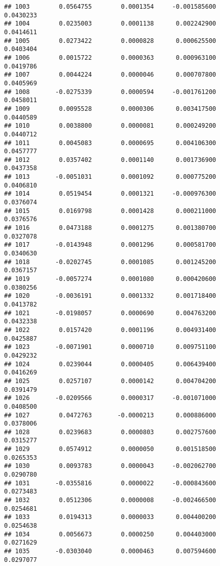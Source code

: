 \documentclass[
]{article}
\begin{document}
\begin{verbatim}
## 1003        0.0564755        0.0001354     -0.001585600             0.0430233
## 1004        0.0235003        0.0001138      0.002242900             0.0414611
## 1005        0.0273422        0.0000828      0.000625500             0.0403404
## 1006        0.0015722        0.0000363      0.000963100             0.0419786
## 1007        0.0044224        0.0000046      0.000707800             0.0405969
## 1008       -0.0275339        0.0000594     -0.001761200             0.0458011
## 1009        0.0095528        0.0000306      0.003417500             0.0440589
## 1010        0.0038800        0.0000081      0.000249200             0.0440712
## 1011        0.0045083        0.0000695      0.004106300             0.0457777
## 1012        0.0357402        0.0001140      0.001736900             0.0437358
## 1013       -0.0051031        0.0001092      0.000775200             0.0406810
## 1014        0.0519454        0.0001321     -0.000976300             0.0376074
## 1015        0.0169798        0.0001428      0.000211000             0.0376576
## 1016        0.0473188        0.0001275      0.001380700             0.0327078
## 1017       -0.0143948        0.0001296      0.000581700             0.0340630
## 1018       -0.0202745        0.0001085      0.001245200             0.0367157
## 1019       -0.0057274        0.0001080      0.000420600             0.0380256
## 1020       -0.0036191        0.0001332      0.001718400             0.0413782
## 1021       -0.0198057        0.0000690      0.004763200             0.0432338
## 1022        0.0157420        0.0001196      0.004931400             0.0425887
## 1023       -0.0071901        0.0000710      0.009751100             0.0429232
## 1024        0.0239044        0.0000405      0.006439400             0.0416269
## 1025        0.0257107        0.0000142      0.004704200             0.0391479
## 1026       -0.0209566        0.0000317     -0.001071000             0.0408500
## 1027        0.0472763       -0.0000213      0.000886000             0.0378006
## 1028        0.0239683        0.0000803      0.002757600             0.0315277
## 1029        0.0574912        0.0000050      0.001518500             0.0265353
## 1030        0.0093783        0.0000043     -0.002062700             0.0290780
## 1031       -0.0355816        0.0000022     -0.000843600             0.0273483
## 1032        0.0512306        0.0000008     -0.002466500             0.0254681
## 1033        0.0194313        0.0000033      0.004400200             0.0254638
## 1034        0.0056673        0.0000250      0.004403000             0.0271629
## 1035       -0.0303040        0.0000463      0.007594600             0.0297077

\end{verbatim}
\end{document}

